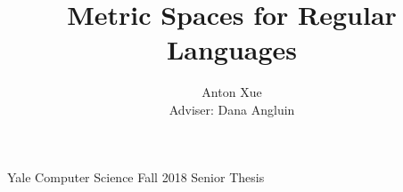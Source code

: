 \documentclass[12pt]{article}
\title{Metric Spaces for Regular Languages}
\author{Anton Xue \\
  Adviser: Dana Angluin
}
\date{}
\begin{document}
\maketitle

\begin{center}
  Yale Computer Science Fall 2018 Senior Thesis
\end{center}

\newpage

\tableofcontents

\newpage























\newpage

\printbibliography


\end{document}
